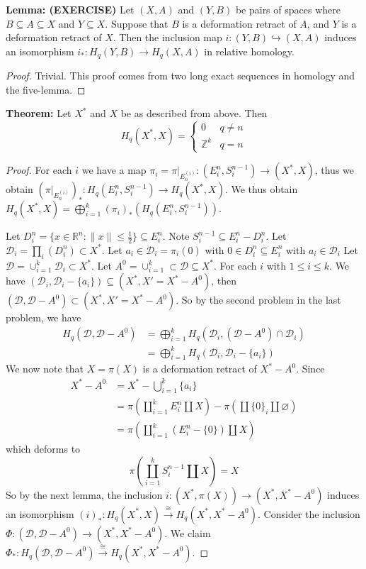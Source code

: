 \documentclass{article}
\begin{document}
\textbf{Lemma: (EXERCISE)} Let $(X,A)$ and $(Y,B)$ be pairs of spaces where $B \subseteq A \subseteq X$ and $Y \subseteq X$. Suppose that $B$ is a deformation retract of $A$, and $Y$ is a deformation retract of $X$. Then the inclusion map $i: (Y,B) \hookrightarrow (X,A)$ induces an isomorphism $i_*: H_q(Y,B) \to H_q(X, A)$ in relative homology.
\begin{proof}
Trivial. This proof comes from two long exact sequences in homology and the five-lemma.
\end{proof}

\textbf{Theorem:} Let $X^*$ and $X$ be as described from above. Then
\[
H_q(X^*, X) = \begin{cases}
0 & q \neq n \\
\mathbb{Z}^k & q = n
\end{cases}
\]
\begin{proof}

For each $i$ we have a map $\pi_i = \pi|_{E_n^{(i)}}: (E^n_i, S^{n-1}_i) \to (X^*, X)$, thus we obtain $(\pi|_{E_n^{(i)}})_*: H_q(E^n_i, S^{n-1}_i) \to H_q(X^*, X)$. We thus obtain $H_q(X^*, X) = \bigoplus_{i=1}^k(\pi_i)_*(H_q(E^n_i, S^{n-1}_i))$.

Let $D_i^n = \{ x \in \mathbb{R}^n: \| x \| \leq \frac{1}{2} \} \subseteq E^n_i$. Note $S^{n-1}_i \subseteq E^n_i - D^n_i$. Let $\mathcal{D}_i = \prod_i(D_i^n) \subset X^*$. Let $a_i \in \mathcal{D}_i = \pi_i(0)$ with $0 \in D_i^n \subseteq E^n_i$ with $a_i \in \mathcal{D}_i$
Let $\mathcal{D} = \cup_{i=1}^k \mathcal{D}_i \subset X^*$. Let $A^0 = \cup^{k}_{i=1} \subset \mathcal{D} \subseteq X^*$. For each $i$ with $1 \leq i \leq k$. We have $(\mathcal{D}_i, \mathcal{D}_i - \{ a_i \}) \subseteq (X^*, X' = X^* - A^0)$, then $(\mathcal{D}, \mathcal{D} - A^0) \subset (X^*, X' = X^* - A^0)$. So by the second problem in the last problem, we have
\begin{align*}
H_q(\mathcal{D}, \mathcal{D} - A^0) & = \bigoplus_{i=1}^k H_q(\mathcal{D}_i, (\mathcal{D} - A^0) \cap \mathcal{D}_i) \\
& = \bigoplus_{i=1}^k H_q(\mathcal{D}_i, \mathcal{D}_i - \{ a_i \})
\end{align*}
We now note that $X = \pi(X)$ is a deformation retract of $X^* - A^0$. Since 
\begin{align*}
X^* - A^0 &= X^* - \bigcup_{i=1}^k\{ a_i \} \\
& = \pi(\coprod_{i=1}^k E_i^n \coprod X) - \pi(\coprod \{ 0 \}_i \coprod \varnothing)\\
& = \pi(\coprod_{i=1}^k (E_i^n - \{ 0 \}) \coprod X)
\end{align*}
which deforms to
\[
\pi(\coprod_{i=1}^k S^{n-1}_i \coprod X) = X
\]
So by the next lemma, the inclusion $i:(X^*, \pi(X)) \to (X^*, X^* - A^0)$ induces an isomorphism $(i)_*: H_q(X^*, X) \xrightarrow{\cong} H_q(X^*, X^* - A^0)$. Consider the inclusion $\Phi: (\mathcal{D}, \mathcal{D}-A^0) \to (X^*, X^* - A^0)$. We claim $\Phi_*: H_q(\mathcal{D}, \mathcal{D}-A^0) \xrightarrow{\cong} H_q(X^*, X^* - A^0)$.


\end{proof}
\end{document}
